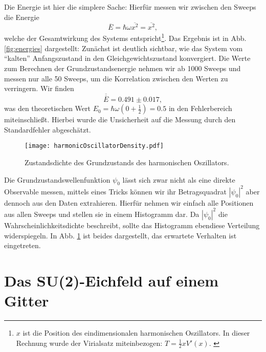 Die Energie ist hier die simplere Sache: Hierfür messen wir zwischen den Sweeps
die Energie
\[
    \overline{E} = \hbar \omega \overline{x^2} = \overline{x^2},
\]
welche der Gesamtwirkung des Systems entspricht\footnote{$x$ ist die Position des
eindimensionalen harmonischen Oszillators. In dieser Rechnung wurde
der Virialsatz miteinbezogen: $T = \frac{1}{2} x V'(x)$. \cite{freedmanCreutz}}.
Das Ergebnis ist
in Abb. \ref{fig:energies} dargestellt: Zunächst ist deutlich sichtbar, wie das System
vom \enquote{kalten} Anfangszustand in den Gleichgewichtszustand konvergiert. Die
Werte zum Berechnen der Grundzustandsenergie nehmen wir ab 1000 Sweeps und
messen nur alle 50 Sweeps, um die Korrelation zwischen den Werten zu verringern.
Wir finden
\[
    \overline{\overline{E}} = 0.491 \pm 0.017,
\]
was den theoretischen Wert $E_0 = \hbar \omega (0 + \frac{1}{2}) = 0.5$
\cite{freedmanCreutz} in den Fehlerbereich miteinschließt. Hierbei wurde die
Unsicherheit auf die Messung durch den Standardfehler abgeschätzt.


\begin{figure}[htbp]
    \centering
    \texttt{[image: harmonicOscillatorDensity.pdf]}
    \caption{Zustandsdichte des Grundzustands des harmonischen Oszillators.}
    \label{fig:harmonicOscDensity}
\end{figure}

Die Grundzustandswellenfunktion $\psi_0$ lässt sich zwar nicht als eine direkte
Observable messen, mittels eines Tricks können wir ihr Betragsquadrat $| \psi_0 |^2$
aber dennoch aus den Daten extrahieren. Hierfür nehmen wir einfach alle Positionen
aus allen Sweeps und stellen sie in einem Histogramm dar. Da $| \psi_0 |^2$ die
Wahrscheinlichkeitsdichte beschreibt, sollte das Histogramm ebendiese Verteilung
widerspiegeln. In Abb. \ref{fig:harmonicOscDensity} ist beides dargestellt, das
erwartete Verhalten ist eingetreten.

\section{Das SU(2)-Eichfeld auf einem Gitter}
